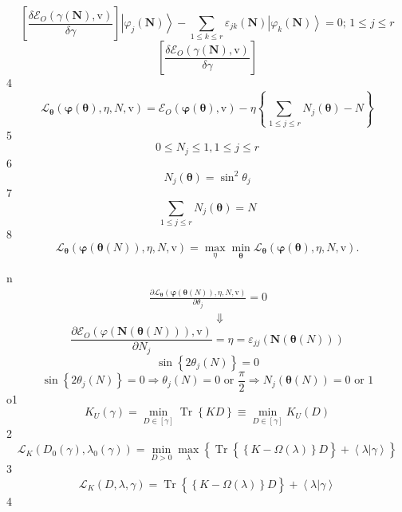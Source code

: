 \documentclass[aps,preprint]{revtex4}%
\begin{document}
\[
\left[  \frac{\delta\mathcal{E}_{O}\left(  \gamma\left(  \mathbf{N}\right)
\mathbf{,}\mathrm{v}\right)  }{\delta\gamma}\right]  \left\vert \varphi
_{j}\left(  \mathbf{N}\right)  \right\rangle -\sum_{1\leq k\leq r}%
\varepsilon_{jk}\left(  \mathbf{N}\right)  \left\vert \varphi_{k}\left(
\mathbf{N}\right)  \right\rangle =0;\,1\leq j\leq r
\]%
\[
\left[  \frac{\delta\mathcal{E}_{O}\left(  \gamma\left(  \mathbf{N}\right)
\mathbf{,}\mathrm{v}\right)  }{\delta\gamma}\right]
\]
4%
\[
\mathcal{L}_{\mathbf{\theta}}\left(  \mathbf{\varphi}\left(  \mathbf{\theta
}\right)  ,\eta,N,\mathrm{v}\right)  =\mathcal{E}_{O}\left(  \mathbf{\varphi
}\left(  \mathbf{\theta}\right)  \mathbf{,}\mathrm{v}\right)  -\eta\left\{
\sum_{\,1\leq j\leq r}N_{j}\left(  \mathbf{\theta}\right)  -N\right\}
\]
5%
\[
0\leq N_{j}\leq1,1\leq j\leq r
\]
6%
\[
N_{j}\left(  \mathbf{\theta}\right)  =\sin^{2}\theta_{j}%
\]
7%
\[
\sum_{1\leq j\leq r}N_{j}\left(  \mathbf{\theta}\right)  =N
\]
8%
\[
\mathcal{L}_{\mathbf{\theta}}\left(  \mathbf{\varphi}\left(  \mathbf{\theta
}\left(  N\right)  \right)  ,\eta,N,\mathrm{v}\right)  =\max_{\eta}%
\min_{\mathbf{\theta}}\mathcal{L}_{\mathbf{\theta}}\left(  \mathbf{\varphi
}\left(  \mathbf{\theta}\right)  ,\eta,N,\mathrm{v}\right)  .
\]


n%
\begin{align*}
&  \frac{\partial\mathcal{L}_{\mathbf{\theta}}\left(  \mathbf{\varphi}\left(
\mathbf{\theta}\left(  N\right)  \right)  ,\eta\mathbf{,}N\mathbf{,}%
\mathrm{v}\right)  }{\partial\theta_{j}}=0\text{ }\\
&  \qquad\qquad\qquad\left.  \Downarrow\right.
\end{align*}%
\[
\frac{\partial\mathcal{E}_{O}\left(  \varphi\left(  \mathbf{N}\left(
\mathbf{\theta}\left(  N\right)  \right)  \right)  ,\mathrm{v}\right)
}{\partial N_{j}}=\eta=\varepsilon_{jj}\left(  \mathbf{\mathbf{N}}\left(
\mathbf{\theta}\left(  N\right)  \right)  \right)
\]%
\[
\sin\left\{  2\theta_{j}\left(  N\right)  \right\}  =0
\]%
\[
\sin\left\{  2\theta_{j}\left(  N\right)  \right\}  =0\Rightarrow\theta
_{j}\left(  N\right)  =0\text{ or }\frac{\pi}{2}\Rightarrow N_{j}\left(
\mathbf{\theta}\left(  N\right)  \right)  =0\text{ or }1
\]
o1%
\[
K_{U}\left(  \gamma\right)  =\min_{D\in\left[  \gamma\right]  }%
\operatorname{Tr}\left\{  KD\right\}  \equiv\min_{D\in\left[  \gamma\right]
}K_{U}\left(  D\right)
\]
2%
\[
\mathcal{L}_{K}\left(  D_{0}\left(  \gamma\right)  ,\lambda_{0}\left(
\gamma\right)  \right)  =\min_{D>0}\max_{\lambda}\left\{  \operatorname{Tr}%
\left\{  \overset{}{\left\{  K-\Omega\left(  \lambda\right)  \right\}
D}\right\}  +\left\langle \lambda\left\vert \gamma\right.  \right\rangle
\right\}
\]
3%
\[
\mathcal{L}_{K}\left(  D,\lambda,\gamma\right)  =\operatorname{Tr}\left\{
\overset{}{\left\{  K-\Omega\left(  \lambda\right)  \right\}  D}\right\}
+\left\langle \left.  \lambda\right\vert \gamma\right\rangle
\]
4
\end{document}
